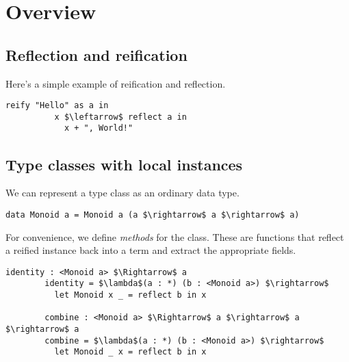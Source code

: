 \section{Overview}

  \subsection{Reflection and reification}

    Here's a simple example of reification and reflection.

    \noindent
    \begin{minipage}{\linewidth}
      \begin{lstlisting}[gobble=8, mathescape=true]
        reify "Hello" as a in
          x $\leftarrow$ reflect a in
            x + ", World!"
      \end{lstlisting}
    \end{minipage}

  \subsection{Type classes with local instances}

    We can represent a type class as an ordinary data type.

    \noindent
    \begin{minipage}{\linewidth}
      \begin{lstlisting}[gobble=8, mathescape=true]
        data Monoid a = Monoid a (a $\rightarrow$ a $\rightarrow$ a)
      \end{lstlisting}
    \end{minipage}

    \noindent For convenience, we define \emph{methods} for the class. These are functions that reflect a reified instance back into a term and extract the appropriate fields.

    \noindent
    \begin{minipage}{\linewidth}
      \begin{lstlisting}[gobble=8, mathescape=true]
        identity : <Monoid a> $\Rightarrow$ a
        identity = $\lambda$(a : *) (b : <Monoid a>) $\rightarrow$
          let Monoid x _ = reflect b in x

        combine : <Monoid a> $\Rightarrow$ a $\rightarrow$ a $\rightarrow$ a
        combine = $\lambda$(a : *) (b : <Monoid a>) $\rightarrow$
          let Monoid _ x = reflect b in x
      \end{lstlisting}
    \end{minipage}

